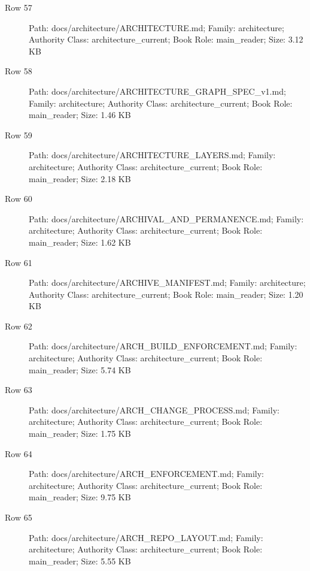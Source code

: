 \documentclass[9pt,a4paper]{book}
\begin{document}
\begin{description}
\item[Row 57] Path: docs/\allowbreak{}architecture/\allowbreak{}ARCHITECTURE.\allowbreak{}md; Family: architecture; Authority Class: architecture\_\allowbreak{}current; Book Role: main\_\allowbreak{}reader; Size: 3.\allowbreak{}12 KB
\item[Row 58] Path: docs/\allowbreak{}architecture/\allowbreak{}ARCHITECTURE\_\allowbreak{}GRAPH\_\allowbreak{}SPEC\_\allowbreak{}v1.\allowbreak{}md; Family: architecture; Authority Class: architecture\_\allowbreak{}current; Book Role: main\_\allowbreak{}reader; Size: 1.\allowbreak{}46 KB
\item[Row 59] Path: docs/\allowbreak{}architecture/\allowbreak{}ARCHITECTURE\_\allowbreak{}LAYERS.\allowbreak{}md; Family: architecture; Authority Class: architecture\_\allowbreak{}current; Book Role: main\_\allowbreak{}reader; Size: 2.\allowbreak{}18 KB
\item[Row 60] Path: docs/\allowbreak{}architecture/\allowbreak{}ARCHIVAL\_\allowbreak{}AND\_\allowbreak{}PERMANENCE.\allowbreak{}md; Family: architecture; Authority Class: architecture\_\allowbreak{}current; Book Role: main\_\allowbreak{}reader; Size: 1.\allowbreak{}62 KB
\item[Row 61] Path: docs/\allowbreak{}architecture/\allowbreak{}ARCHIVE\_\allowbreak{}MANIFEST.\allowbreak{}md; Family: architecture; Authority Class: architecture\_\allowbreak{}current; Book Role: main\_\allowbreak{}reader; Size: 1.\allowbreak{}20 KB
\item[Row 62] Path: docs/\allowbreak{}architecture/\allowbreak{}ARCH\_\allowbreak{}BUILD\_\allowbreak{}ENFORCEMENT.\allowbreak{}md; Family: architecture; Authority Class: architecture\_\allowbreak{}current; Book Role: main\_\allowbreak{}reader; Size: 5.\allowbreak{}74 KB
\item[Row 63] Path: docs/\allowbreak{}architecture/\allowbreak{}ARCH\_\allowbreak{}CHANGE\_\allowbreak{}PROCESS.\allowbreak{}md; Family: architecture; Authority Class: architecture\_\allowbreak{}current; Book Role: main\_\allowbreak{}reader; Size: 1.\allowbreak{}75 KB
\item[Row 64] Path: docs/\allowbreak{}architecture/\allowbreak{}ARCH\_\allowbreak{}ENFORCEMENT.\allowbreak{}md; Family: architecture; Authority Class: architecture\_\allowbreak{}current; Book Role: main\_\allowbreak{}reader; Size: 9.\allowbreak{}75 KB
\item[Row 65] Path: docs/\allowbreak{}architecture/\allowbreak{}ARCH\_\allowbreak{}REPO\_\allowbreak{}LAYOUT.\allowbreak{}md; Family: architecture; Authority Class: architecture\_\allowbreak{}current; Book Role: main\_\allowbreak{}reader; Size: 5.\allowbreak{}55 KB

\end{description}
\end{document}
